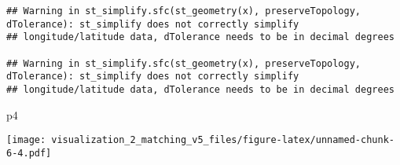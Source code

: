 \documentclass[
]{article}
\newenvironment{Shaded}{\begin{snugshade}}{\end{snugshade}}
\newcommand{\NormalTok}[1]{#1}
\begin{document}
\begin{verbatim}
## Warning in st_simplify.sfc(st_geometry(x), preserveTopology, dTolerance): st_simplify does not correctly simplify
## longitude/latitude data, dTolerance needs to be in decimal degrees

## Warning in st_simplify.sfc(st_geometry(x), preserveTopology, dTolerance): st_simplify does not correctly simplify
## longitude/latitude data, dTolerance needs to be in decimal degrees
\end{verbatim}

\begin{Shaded}
\begin{Highlighting}[]
\NormalTok{p4}
\end{Highlighting}
\end{Shaded}

\texttt{[image: visualization\_2\_matching\_v5\_files/figure-latex/unnamed-chunk-6-4.pdf]}
\end{document}
